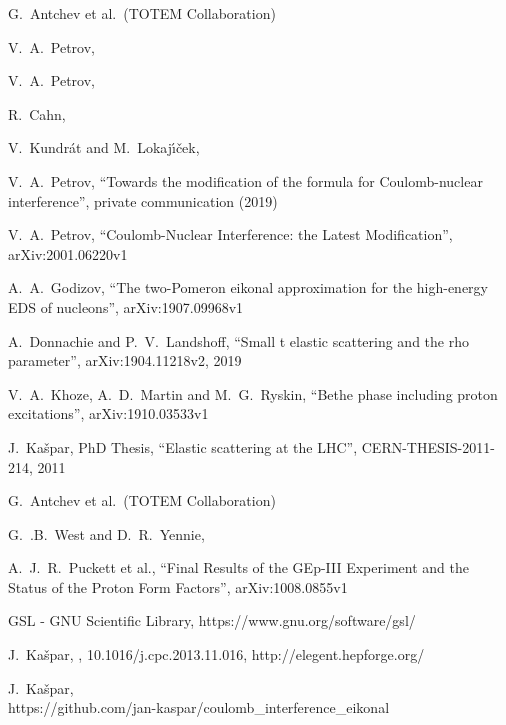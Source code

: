\documentclass[pdftex,twocolumn,epjc3]{svjour3}
\begin{document}
\begin{thebibliography}{9}

	G.~Antchev et al.~(TOTEM Collaboration)

	V.~A.~Petrov,

	V.~A.~Petrov,

	R.~Cahn,

	V.~Kundr\'{a}t and M.~Lokaj\'{\i}\v{c}ek,

	V.~A.~Petrov,
	``Towards the modification of the formula for Coulomb-nuclear interference'',
	private communication (2019)

	V.~A.~Petrov,
	``Coulomb-Nuclear Interference: the Latest Modification'',
	arXiv:2001.06220v1

	A.~A.~Godizov,
	``The two-Pomeron eikonal approximation for the high-energy EDS of nucleons'',
	arXiv:1907.09968v1

	A.~Donnachie and  P.~V.~Landshoff,
	``Small t elastic scattering and the rho parameter'',
	arXiv:1904.11218v2,
	2019

	V.~A.~Khoze, A.~D.~Martin and M.~G.~Ryskin,
	``Bethe phase including proton excitations'',
	arXiv:1910.03533v1
	
	J.~Ka\v{s}par,
	PhD Thesis,
	``Elastic scattering at the LHC'',
	CERN-THESIS-2011-214,
	2011

	G.~Antchev et al.~(TOTEM Collaboration)

	G.~.B.~West and D.~R.~Yennie,

	A.~J.~R.~Puckett et al.,
	``Final Results of the GEp-III Experiment and the Status of the Proton Form Factors'',
	arXiv:1008.0855v1

	GSL - GNU Scientific Library,
	https://www.gnu.org/software/gsl/

	J.~Ka\v{s}par,
	,
	10.1016/j.cpc.2013.11.016,
	http://elegent.hepforge.org/

	J.~Ka\v{s}par,\\
	https://github.com/jan-kaspar/coulomb\_interference\_eikonal
	

\end{thebibliography}
\end{document}
